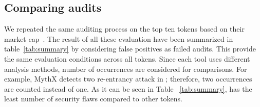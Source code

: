 
\subsection{Comparing audits}
We repeated the same auditing process on the top ten tokens based on their market cap~\cite{EtherScan}. The result of all these evaluation have been summarized in table~\ref{tab:summary} by considering false positives as failed audits. This provide the same evaluation conditions across all tokens. Since each tool uses different analysis methods, number of occurrences are considered for comparisons. For example, MythX detects two re-entrancy attack in \sys; therefore, two occurrences are counted instead of one. As it can be seen in Table ~\ref{tab:summary}, \sys has the least number of security flaws compared to other tokens.


